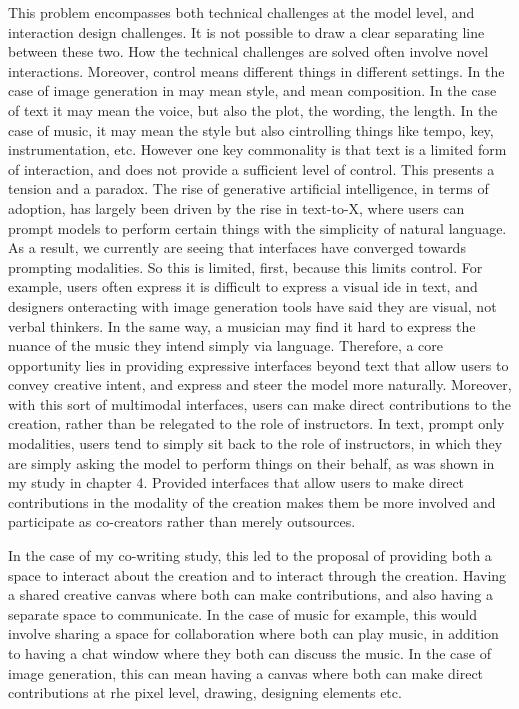 This problem encompasses both technical challenges at the model level, and interaction design challenges. It is not possible to draw a clear separating line between these two. How the technical challenges are solved often involve novel interactions. 
Moreover, control means different things in different settings. 
In the case of image generation in may mean style, and mean composition. In the case of text it may mean the voice, but also the plot, the wording, the length. In the case of music, it may mean the style but also cintrolling things like tempo, key, instrumentation, etc. 
However one key commonality is that text is a limited form of interaction, and does not provide a sufficient level of control. 
This presents a tension and a paradox. 
The rise of generative artificial intelligence, in terms of adoption, has largely been driven by the rise in text-to-X, where users can prompt models to perform certain things with the simplicity of natural language. 
As a result, we currently are seeing that interfaces have converged towards prompting modalities.
So this is limited, first, because this limits control. For example, users often express it is difficult to express a visual ide in text, and designers onteracting with image generation tools have said they are visual, not verbal thinkers. In the same way, a musician may find it hard to express the nuance of the music they intend simply via language. 
Therefore, a core opportunity lies in providing expressive interfaces beyond text that allow users to convey creative intent, and express and steer the model more naturally. 
Moreover, with this sort of multimodal interfaces, users can make direct contributions to the creation, rather than be relegated to the role of instructors. 
In text, prompt only modalities, users tend to simply sit back to the role of instructors, in which they are simply asking the model to perform things on their behalf, as was shown in my study in chapter 4. 
Provided interfaces that allow users to make direct contributions in the modality of the creation makes them be more involved and participate as co-creators rather than merely outsources. 

In the case of my co-writing study, this led to the proposal of providing both a space to interact about the creation and to interact through the creation. Having a shared creative canvas where both can make contributions, and also having a separate space to communicate. In the case of music for example, this would involve sharing a space for collaboration where both can play music, in addition to having a chat window where they both can discuss the music. In the case of image generation, this can mean having a canvas where both can make direct contributions at rhe pixel level, drawing, designing elements etc. 

